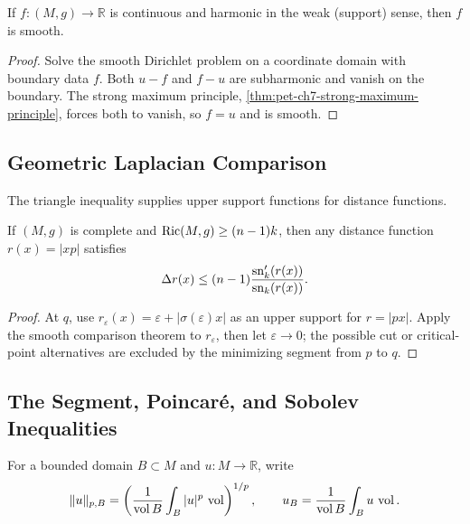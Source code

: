 \begin{theorem}
  \label{thm:pet-ch7-harmonic-regularity}
  If $f:(M,g)\to\mathbb{R}$ is continuous and harmonic in the weak (support) sense,
  then $f$ is smooth.
\end{theorem}
\begin{proof}
  \sketch
  Solve the smooth Dirichlet problem on a coordinate domain with boundary data \(f\). Both \(u-f\) and \(f-u\) are subharmonic and vanish on the boundary. The strong maximum principle, \cref{thm:pet-ch7-strong-maximum-principle}, forces both to vanish, so \(f=u\) and is smooth.
\end{proof}

\subsection{Geometric Laplacian Comparison}

The triangle inequality supplies upper support functions for distance
functions.

\begin{lemma}
  \label{lem:pet-ch7-laplacian-comparison-calabi}
  If $(M,g)$ is complete and $\operatorname{Ric}(M,g)\ge(n-1)k$, then any distance function
  $r(x)=|xp|$ satisfies
  \[
    \Delta r(x)\le(n-1)\frac{\mathrm{sn}_k'(r(x))}{\mathrm{sn}_k(r(x))}.
  \]
\end{lemma}
\begin{proof}
  \sketch
  At \(q\), use \(r_\varepsilon(x)=\varepsilon+|\sigma(\varepsilon)x|\) as an upper support for \(r=|px|\). Apply the smooth comparison theorem to \(r_\varepsilon\), then let \(\varepsilon\to0\); the possible cut or critical-point alternatives are excluded by the minimizing segment from \(p\) to \(q\).
\end{proof}

\subsection{The Segment, Poincaré, and Sobolev Inequalities}

For a bounded domain $B\subset M$ and $u:M\to\mathbb{R}$, write
\[
  \|u\|_{p,B}=\left(\frac{1}{\operatorname{vol} B}\int_B|u|^p\,\operatorname{vol}\right)^{1/p},\qquad
  u_B=\frac{1}{\operatorname{vol} B}\int_Bu\,\operatorname{vol}.
\]

